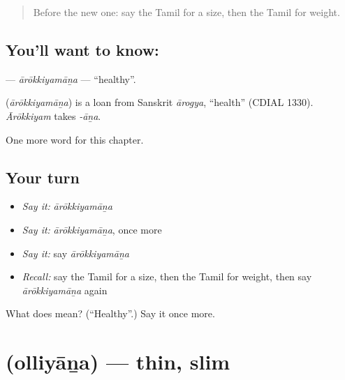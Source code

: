 \label{lesson:TA-C238-arokkiyamana}



\begin{quote}
Before the new one: say the Tamil for a size, then the Tamil for weight.
\end{quote}

\subsection*{You'll want to know: }
\textbf{} — \emph{ārōkkiyamāṉa} — \textquotedblleft{}healthy\textquotedblright{}.

\begin{cousinweb}
\textbf{} (\emph{ārōkkiyamāṉa}) is a loan from Sanskrit \emph{ārogya}, \textquotedblleft{}health\textquotedblright{} (CDIAL 1330). \emph{Ārōkkiyam} takes \emph{-āṉa}.
\end{cousinweb}

\begin{grammarlens}[title={What you've built}]
One more word for this chapter.
\end{grammarlens}

\subsection*{Your turn}
\begin{itemize}
\raggedright
  \item \emph{Say it:} \emph{ārōkkiyamāṉa}
  \item \emph{Say it:} \emph{ārōkkiyamāṉa}, once more
  \item \emph{Say it:} say \emph{ārōkkiyamāṉa}
  \item \emph{Recall:} say the Tamil for a size, then the Tamil for weight, then say \emph{ārōkkiyamāṉa} again
\end{itemize}

\begin{tcolorbox}[breakable,colback=teal!4,colframe=teal!35!black,title={Before you move on}]
What does  mean? (\textquotedblleft{}Healthy\textquotedblright{}.) Say it once more.
\end{tcolorbox}
\section[\texorpdfstring{\ta{ஒல்லியான} (olliyāṉa)}{ஒல்லியான (olliyāṉa)}]{ (olliyāṉa) — thin, slim}

